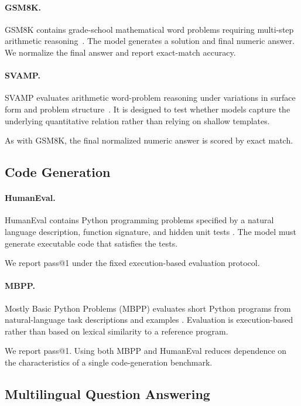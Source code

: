 \paragraph{GSM8K.}
GSM8K contains grade-school mathematical word problems requiring
multi-step arithmetic reasoning~\cite{cobbe2021gsm8k}. The model
generates a solution and final numeric answer. We normalize the final
answer and report exact-match accuracy.


\paragraph{SVAMP.}
SVAMP evaluates arithmetic word-problem reasoning under variations in
surface form and problem structure~\cite{patel2021svamp}. It is
designed to test whether models capture the underlying quantitative
relation rather than relying on shallow templates.

As with GSM8K, the final normalized numeric answer is scored by exact
match.


\subsection{Code Generation}
\label{app:benchmark-code}

\paragraph{HumanEval.}
HumanEval contains Python programming problems specified by a natural
language description, function signature, and hidden unit tests
\cite{chen2021humaneval}. The model must generate executable code that
satisfies the tests.

We report pass@1 under the fixed execution-based evaluation protocol.


\paragraph{MBPP.}
Mostly Basic Python Problems (MBPP) evaluates short Python programs
from natural-language task descriptions and examples
\cite{austin2021mbpp}. Evaluation is execution-based rather than
based on lexical similarity to a reference program.

We report pass@1. Using both MBPP and HumanEval reduces dependence on
the characteristics of a single code-generation benchmark.


\subsection{Multilingual Question Answering}
\label{app:benchmark-multilingual}

